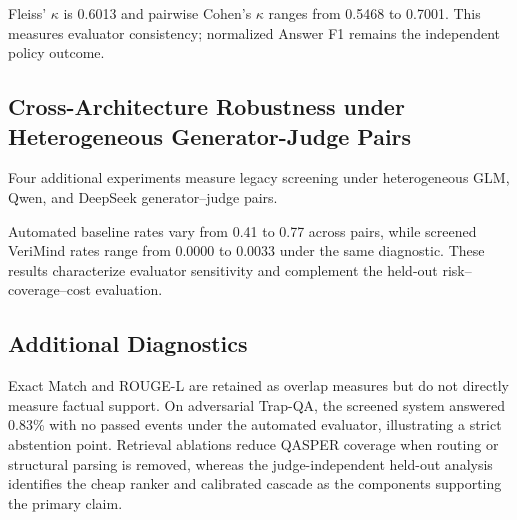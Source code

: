 \documentclass[smallextended]{svjour3}
\begin{document}
Fleiss' $\kappa$ is 0.6013 and pairwise Cohen's $\kappa$ ranges from 0.5468 to 0.7001. This measures evaluator consistency; normalized Answer F1 remains the independent policy outcome.

\subsection{Cross-Architecture Robustness under Heterogeneous Generator-Judge Pairs}
\label{subsec:cross_arch_results}

Four additional experiments measure legacy screening under heterogeneous GLM, Qwen, and DeepSeek generator--judge pairs.

\begin{table}[t]
\centering
\caption{Cross-Architecture Results under E2--E5}
\label{tab:cross_arch_results}
\renewcommand{\arraystretch}{1.15}
\end{table}

Automated baseline rates vary from 0.41 to 0.77 across pairs, while screened VeriMind rates range from 0.0000 to 0.0033 under the same diagnostic. These results characterize evaluator sensitivity and complement the held-out risk--coverage--cost evaluation.

\subsection{Additional Diagnostics}
\label{subsec:additional_diagnostics}
Exact Match and ROUGE-L are retained as overlap measures but do not directly measure factual support. On adversarial Trap-QA, the screened system answered 0.83\% with no passed events under the automated evaluator, illustrating a strict abstention point. Retrieval ablations reduce QASPER coverage when routing or structural parsing is removed, whereas the judge-independent held-out analysis identifies the cheap ranker and calibrated cascade as the components supporting the primary claim.
\end{document}
